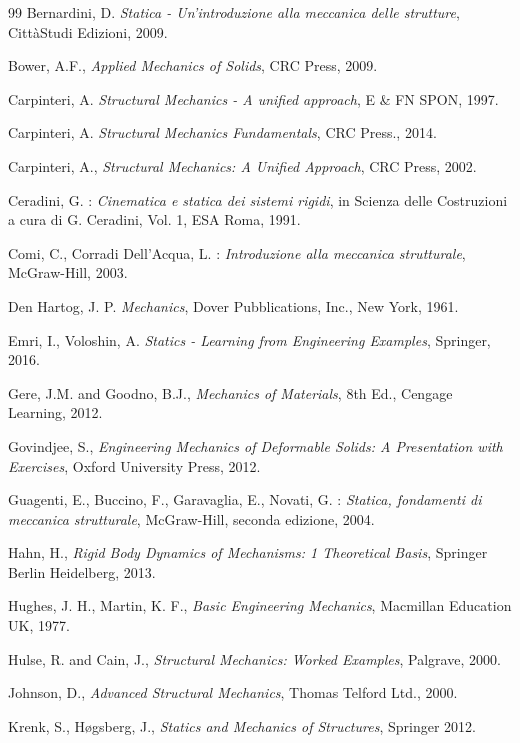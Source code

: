 \begin{thebibliography}{99}
Bernardini, D. \emph{Statica - Un'introduzione alla meccanica delle strutture}, CittàStudi Edizioni, 2009. 

Bower, A.F., {\em Applied Mechanics of Solids}, CRC Press, 2009.

Carpinteri, A. \emph{Structural Mechanics - A unified approach}, E \& FN SPON, 1997.

Carpinteri, A. \emph{Structural Mechanics Fundamentals}, CRC Press., 2014.

Carpinteri, A., {\em Structural Mechanics: A Unified Approach}, CRC Press, 2002.

Ceradini, G. : {\em Cinematica e statica dei sistemi rigidi}, in Scienza
delle Costruzioni a cura di G. Ceradini, Vol. 1, ESA Roma, 1991.

Comi, C., Corradi Dell'Acqua, L. : {\em Introduzione alla meccanica
	strutturale}, McGraw-Hill, 2003.

Den Hartog, J. P. \emph{Mechanics}, Dover Pubblications, Inc., New
York, 1961.

Emri, I., Voloshin, A. {\em Statics - Learning from Engineering Examples}, Springer, 2016.

Gere, J.M. and Goodno, B.J., {\em Mechanics of Materials}, 8th Ed., Cengage Learning, 2012.

Govindjee, S., {\em Engineering Mechanics of Deformable Solids: A Presentation with Exercises}, Oxford University Press, 2012.

Guagenti, E., Buccino, F., Garavaglia, E., Novati, G. : \emph{Statica,
	fondamenti di meccanica strutturale}, McGraw-Hill, seconda edizione,
2004.

Hahn, H., {\em Rigid Body Dynamics of Mechanisms: 1 Theoretical Basis}, Springer Berlin Heidelberg, 2013.

Hughes, J. H., Martin, K. F., {\em Basic Engineering Mechanics}, Macmillan Education UK, 1977.

Hulse, R. and Cain, J., {\em Structural Mechanics: Worked Examples}, Palgrave, 2000.

Johnson, D., {\em Advanced Structural Mechanics}, Thomas Telford Ltd., 2000.

Krenk, S., Høgsberg, J., {\em Statics and Mechanics of Structures}, Springer 2012. 


\end{thebibliography}
